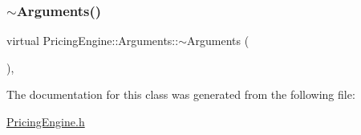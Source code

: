 \hypertarget{class_pricing_engine_1_1_arguments_a383465da5f7d0188a540264692ac2eff}{}\label{class_pricing_engine_1_1_arguments_a383465da5f7d0188a540264692ac2eff} 
\subsubsection{\texorpdfstring{$\sim$\+Arguments()}{~Arguments()}}
{\footnotesize\ttfamily virtual Pricing\+Engine\+::\+Arguments\+::$\sim$\+Arguments (\begin{DoxyParamCaption}{ }\end{DoxyParamCaption})\hspace{0.3cm}{\ttfamily [inline]}, {\ttfamily [virtual]}}



The documentation for this class was generated from the following file\+:\begin{DoxyCompactItemize}
\item 
\hyperlink{_pricing_engine_8h}{Pricing\+Engine.\+h}\end{DoxyCompactItemize}
